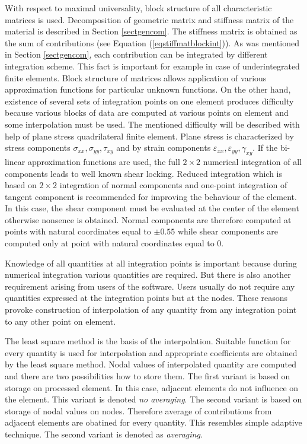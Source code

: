 With respect to maximal universality, block structure of all characteristic matrices is used.
Decomposition of geometric matrix and stiffness matrix of the material is described in Section \ref{sectgencom}.
The stiffness matrix is obtained as the sum of contributions (see Equation (\ref{eqstiffmatblockint})).
As was mentioned in Section \ref{sectgencom}, each contribution can be integrated by different integration
scheme. This fact is important for example in case of underintegrated finite elements. Block structure of
matrices allows application of various approximation functions for particular unknown functions.
On the other hand, existence of several sets of integration points on one element produces difficulty because
various blocks of data are computed at various points on element and some interpolation must be used. The
mentioned difficulty will be described with help of plane stress quadrilateral finite element. Plane stress
is characterized by stress components $\sigma_{xx}, \sigma_{yy}, \tau_{xy}$ and by strain components
$\varepsilon_{xx}, \varepsilon_{yy}, \gamma_{xy}$. If the bi-linear approximation functions are used, the full
$2 \times 2$ numerical integration of all components leads to well known shear locking. Reduced integration
which is based on $2 \times 2$ integration of normal components and one-point integration of tangent component
is recommended for improving the behaviour of the element. In this case, the shear component must be evaluated
at the center of the element otherwise nonsence is obtained. Normal components are therefore computed at points
with natural coordinates equal to $\pm0.55$ while shear components are computed only at point with natural
coordinates equal to $0$.

Knowledge of all quantities at all integration points is important because during numerical integration
various quantities are required. But there is also another requirement arising from users of the software.
Users usually do not require any quantities expressed at the integration points but at the nodes.
These reasons provoke construction of interpolation of any quantity from any integration point to any other
point on element.

The least square method is the basis of the interpolation. Suitable function for every quantity is used for
interpolation and appropriate coefficients are obtained by the least square method. Nodal values of interpolated
quantity are computed and there are two possibilities how to store them. The first variant is based on storage
on processed element. In this case, adjacent elements do not influence on the element. This variant is denoted
{\it no averaging}. The second variant is based on storage of nodal values on nodes. Therefore average of contributions
from adjacent elements are obatined for every quantity. This resembles simple adaptive technique. The second
variant is denoted as {\it averaging}.

